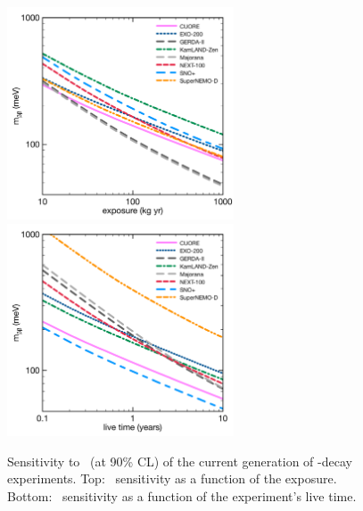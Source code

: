 \documentclass{PoS}
\begin{document}
\begin{figure}
\centering
\includegraphics[width=0.6\textwidth]{img/SensNMCurrentGenExposure.pdf}
\includegraphics[width=0.6\textwidth]{img/SensNMCurrentGenTime.pdf}
\caption{Sensitivity to \mbb\ (at 90\% CL) of the current generation of \bbonu-decay experiments. Top: \mbb\ sensitivity as a function of the exposure. Bottom: \mbb\ sensitivity as a function of the experiment's live time.} \label{fig:SensNMCurrentGen}
\end{figure}
\end{document}
